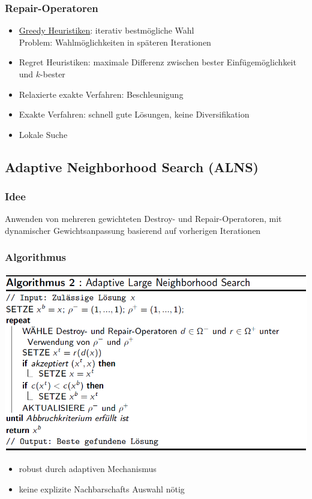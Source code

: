 \documentclass[12pt]{article}
\begin{document}
		\subsubsection{Repair-Operatoren}
			\begin{itemize}
				\item \hyperref[greedy]{Greedy Heuristiken}: iterativ bestmögliche Wahl \\
					Problem: Wahlmöglichkeiten in späteren Iterationen
				\item Regret Heuristiken: maximale Differenz zwischen bester Einfügemöglichkeit und $k$-bester
				\item Relaxierte exakte Verfahren: Beschleunigung
				\item Exakte Verfahren: schnell gute Lösungen, keine Diversifikation
				\item Lokale Suche
			\end{itemize}
		\subsection{Adaptive Neighborhood Search (ALNS)}
		\subsubsection{Idee}
			Anwenden von mehreren gewichteten Destroy- und Repair-Operatoren, mit dynamischer Gewichtsanpassung basierend auf vorherigen Iterationen
		\subsubsection{Algorithmus}
			\includegraphics[scale=0.6]{ALNS}
			\begin{itemize}
				\item robust durch adaptiven Mechanismus
				\item keine explizite Nachbarschafts Auswahl nötig
			\end{itemize}
\end{document}

